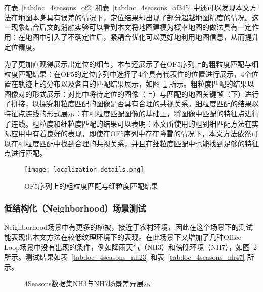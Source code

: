 在表~\ref{tab:loc_4seasons_of2} 和表~\ref{tab:loc_4seasons_of345} 中还可以发现本文方法在地图本身具有误差的情况下，定位结果却出现了部分超越地图精度的情况。这一现象结合后文的消融实验可以看到本文将地图建模为概率地图的做法具有一定作用：在地图中引入了不确定性后，紧耦合优化可以更好地利用地图信息，从而提升定位精度。

为了更加直观得展示出定位的细节，本节还展示了在OF5序列上的粗粒度匹配与细粒度匹配结果：在OF5的定位序列中选择了4个具有代表性的位置进行展示，4个位置在轨迹上的分布以及各自的匹配结果展示，如图~\ref{fig:loc_4seasons_of5_details} 所示。粗粒度匹配的结果以图像对的形式展示：对比中将待定位的图像（上）与匹配的地图关键帧（下）进行了拼接，以探究粗粒度匹配的图像是否具有合理的共视关系。细粒度匹配的结果以特征点连线的形式展示：在粗粒度匹配图像的基础上，将图像中匹配的特征点进行了连线。粗粒度和细粒度匹配的结果可以表明：本文所使用的粗到细匹配方法在实际应用中有着良好的表现，即使在OF5序列中存在降雪的情况下，本文方法依然可以在粗粒度匹配中找到合理的共视关系，并且在细粒度匹配中也能找到足够的特征点进行匹配。

\begin{figure}
  \centering
  \texttt{[image: localization\_details.png]}
  \caption{OF5序列上的粗粒度匹配与细粒度匹配结果}
  \label{fig:loc_4seasons_of5_details}
\end{figure}


\subsubsection{低结构化（Neighborhood）场景测试}

Neighborhood场景中有更多的植被，接近于农村环境，因此在这个场景下的测试能表现出本文方法在较低纹理环境下的表现。在此场景下又增加了几种Office Loop场景中没有出现的条件，例如降雨天气（NH3）和傍晚环境（NH7），如图~\ref{fig:scene_nh} 所示。测试结果如表~\ref{tab:loc_4seasons_nh23} 和表~\ref{tab:loc_4seasons_nh47} 所示。

\begin{figure}
\centering
{}
\caption{4Seasons数据集NH3与NH7场景差异展示}
\label{fig:scene_nh}
\end{figure}

